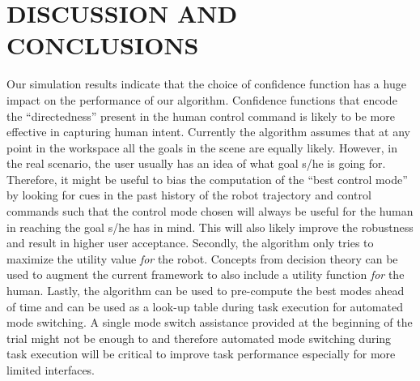 \documentclass[conference]{IEEEtran}
\begin{document}
\section{DISCUSSION AND CONCLUSIONS}\label{DC}
Our simulation results indicate that the choice of confidence function has a huge impact on the performance of our algorithm. Confidence functions that encode the ``directedness'' present in the human control command is likely to be more effective in capturing human intent. Currently the algorithm assumes that at any point in the workspace all the goals in the scene are equally likely. However, in the real scenario, the user usually has an idea of what goal s/he is going for. Therefore, it might be useful to bias the computation of the ``best control mode'' by looking for cues in the past history of the robot trajectory and control commands such that the control mode chosen will always be useful for the human in reaching the goal s/he has in mind. This will also likely improve the robustness and result in higher user acceptance. 
Secondly, the algorithm only tries to maximize the utility value \textit{for} the robot. Concepts from decision theory can be used to augment the current framework to also include a utility function \textit{for} the human. 
Lastly, the algorithm can be used to pre-compute the best modes ahead of time and can be used as a look-up table during task execution for automated mode switching. A single mode switch assistance provided at the beginning of the trial might not be enough to and therefore automated mode switching during task execution will be critical to improve task performance especially for more limited interfaces. 
\end{document}
